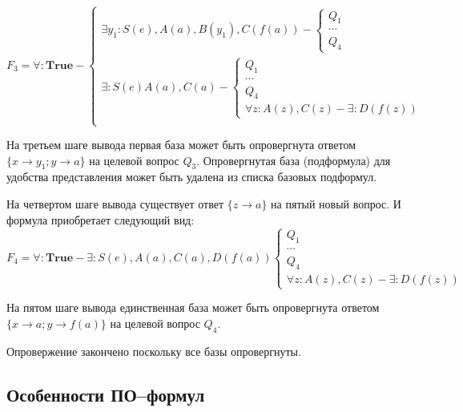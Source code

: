 \begin{example}
\begin{equation*}\label{ex:f3}
F_3 =
\forall:\boldsymbol{True} -
\left\lbrace
\begin{array}{l}
	\exists y_1\colon S(e),A(a),B(y_1),C(f(a)) -
	\left\lbrace
	\begin{array}{l}
		Q_1 \\ \cdots \\ Q_4
	\end{array}\right. \\
	\exists\colon S(e)A(a),C(a) -
	\left\lbrace
	\begin{array}{l}
		Q_1 \\ \cdots \\ Q_4 \\
		\forall z\colon A(z),C(z) - \exists\colon D(f(z))
	\end{array}\right. \\
\end{array}\right.
\end{equation*}

На третьем шаге вывода первая база может быть опровергнута ответом $\{x \rightarrow y_1; y \rightarrow a\}$ на целевой вопрос $Q_3$. Опровергнутая база (подформула) для удобства представления может быть удалена из списка базовых подформул.

На четвертом шаге вывода существует ответ $\{z \rightarrow a\}$ на пятый новый вопрос. И формула приобретает следующий вид:
\begin{equation*}\label{ex:f5}
	F_4 = \forall\colon\boldsymbol{True} - \exists\colon S(e),A(a), C(a),D(f(a))
	\left\lbrace
	\begin{array}{l}
		Q_1 \\ \cdots \\ Q_4 \\
		\forall z\colon A(z),C(z) - \exists\colon D(f(z))
	\end{array}\right.
\end{equation*}

На пятом шаге вывода единственная база может быть опровергнута ответом $\{x \rightarrow a; y \rightarrow f(a)\}$ на целевой вопрос $Q_4$.

Опровержение закончено поскольку все базы опровергнуты.

\end{example}


\subsection{Особенности ПО--формул}

